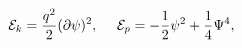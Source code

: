 \begin{equation}
\label{ekep} {\cal E}_{k}=\frac{q^2}{2} (\partial \psi)^2 ,~~~~
{\cal E}_{p}=- \frac{1}{2}\psi^2+ \frac{1}{ 4}\Psi ^4,
\end{equation}

